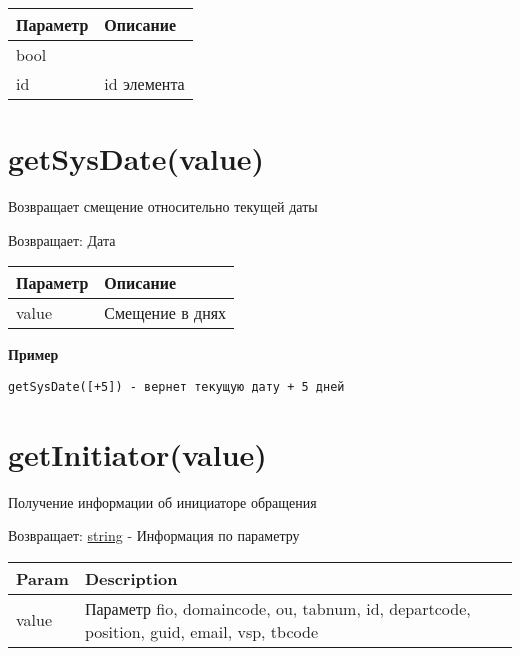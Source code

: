 \begin{longtable}[]{@{}ll@{}}
\toprule
Параметр & Описание\tabularnewline
\midrule
\endhead
bool &\tabularnewline
id & id элемента\tabularnewline
\bottomrule
\end{longtable}

\hypertarget{getsysdatevalue}{%
\section{getSysDate(value)}\label{getsysdatevalue}}

Возвращает смещение относительно текущей даты

Возвращает: Дата

\begin{longtable}[]{@{}ll@{}}
\toprule
Параметр & Описание\tabularnewline
\midrule
\endhead
value & Смещение в днях\tabularnewline
\bottomrule
\end{longtable}

\textbf{Пример}

\begin{verbatim}
getSysDate([+5]) - вернет текущую дату + 5 дней
\end{verbatim}

\hypertarget{getinitiatorvalue-string}{%
\section{getInitiator(value)}\label{getinitiatorvalue-string}}

Получение информации об инициаторе обращения

Возвращает: \protect\hyperlink{string}{string} - Информация по
параметру

\begin{longtable}[]{@{}ll@{}}
\toprule
\begin{minipage}[b]{0.47\columnwidth}\raggedright
Param\strut
\end{minipage} & \begin{minipage}[b]{0.47\columnwidth}\raggedright
Description\strut
\end{minipage}\tabularnewline
\midrule
\endhead
\begin{minipage}[t]{0.47\columnwidth}\raggedright
value\strut
\end{minipage} & \begin{minipage}[t]{0.47\columnwidth}\raggedright
Параметр fio, domaincode, ou, tabnum, id, departcode, position, guid,
email, vsp, tbcode\strut
\end{minipage}\tabularnewline
\bottomrule
\end{longtable}

